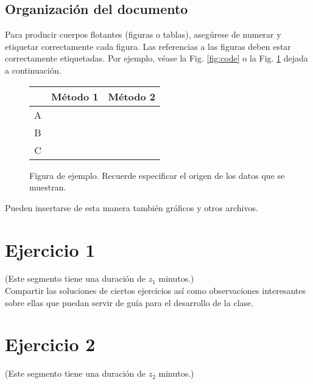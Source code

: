 \documentclass[a4paper,10pt,twocolumn]{article}
\theoremstyle{theorem}
\theoremstyle{definition}
\theoremstyle{remark}
\begin{document}
	\subsection{Organización del documento}\label{sub:results}
Para producir cuerpos flotantes (figuras o tablas), asegúrese de numerar y etiquetar correctamente cada figura. Las referencias a las figuras deben estar correctamente etiquetadas. Por ejemplo, véase la Fig. \ref{fig:code} o la Fig. \ref{fig:ex} dejada a continuación.
	\begin{figure}[h!]%
	\begin{center}
		\begin{tabular}{|c|c|c|} \hline
		 			& Método 1 	& Método 2 	\\ \hline
		A 			&  			&  			\\ \hline
		B			& 			& 			\\ \hline
		C 			& 			&  			\\ \hline
		\end{tabular}
	\caption{Figura de ejemplo. Recuerde especificar el origen de los datos que se muestran.}\label{fig:ex}
	\end{center}
	\end{figure}
 	
Pueden insertarse de esta manera también gráficos y otros archivos.	

\section{Ejercicio 1}\label{sec:ejer_1}
(Este segmento tiene una duración de $z_1$ minutos.)\\

Compartir las soluciones de ciertos ejercicios así como observaciones interesantes sobre ellas que puedan servir de guía para el desarrollo de la clase.


\section{Ejercicio 2}\label{sec:ejer_2}
(Este segmento tiene una duración de $z_2$ minutos.)\\
\end{document}
